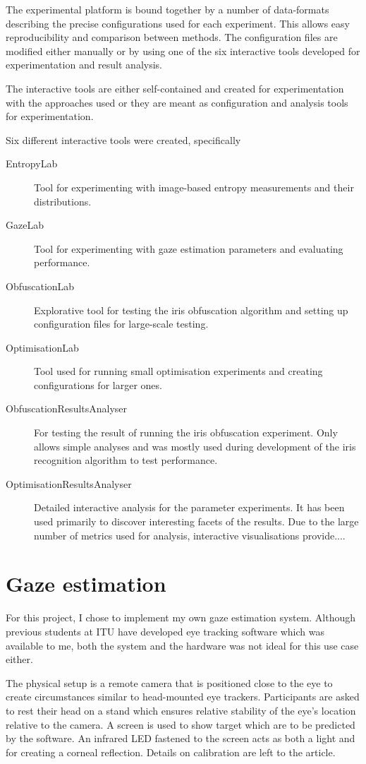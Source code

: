 The experimental platform is bound together by a number of data-formats describing the precise configurations used for each experiment. This allows easy reproducibility and comparison between methods. The configuration files are modified either manually or by using one of the six interactive tools developed for experimentation and result analysis. 

The interactive tools are either self-contained and created for experimentation with the approaches used or they are meant as configuration and analysis tools for experimentation.

Six different interactive tools were created, specifically
\begin{description}
	\item [EntropyLab] Tool for experimenting with image-based entropy measurements and their distributions.
	\item [GazeLab] Tool for experimenting with gaze estimation parameters and evaluating performance.
	\item [ObfuscationLab] Explorative tool for testing the iris obfuscation algorithm and setting up configuration files for large-scale testing. 
	\item [OptimisationLab] Tool used for running small optimisation experiments and creating configurations for larger ones. 
	\item [ObfuscationResultsAnalyser] For testing the result of running the iris obfuscation experiment. Only allows simple analyses and was mostly used during development of the iris recognition algorithm to test performance.
	\item [OptimisationResultsAnalyser] Detailed interactive analysis for the parameter experiments. It has been used primarily to discover interesting facets of the results. Due to the large number of metrics used for analysis, interactive visualisations provide....
\end{description}


\section{Gaze estimation}
For this project, I chose to implement my own gaze estimation system. Although previous students at ITU have developed eye tracking software which was available to me, both the system and the hardware was not ideal for this use case either. 

The physical setup is a remote camera that is positioned close to the eye to create circumstances similar to head-mounted eye trackers. Participants are asked to rest their head on a stand which ensures relative stability of the eye's location relative to the camera. A screen is used to show target which are to be predicted by the software. An infrared LED fastened to the screen acts as both a light and for creating a corneal reflection. Details on calibration are left to the article.

